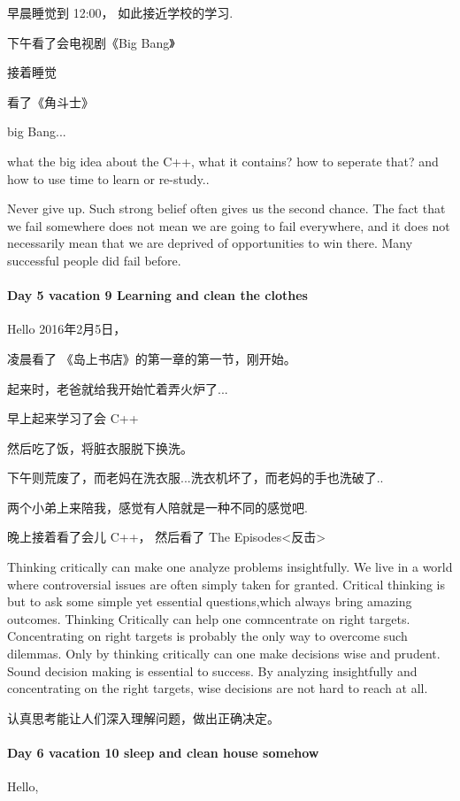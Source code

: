 \documentclass[UTF8,a4paper,8pt]{ctexbook}
\begin{document}
	 	 早晨睡觉到 12:00， 如此接近学校的学习.
	 	 
	 	 下午看了会电视剧《Big Bang》
	 	 
	 	 接着睡觉
	 	 
	 	 看了《角斗士》
	 	 
	 	 big Bang...
	 	 
	 	 what the big idea about the C++, what it contains? how to seperate that? and how to use time to learn or re-study..
	 	 
	 	 Never give up. Such strong belief often gives us the second chance. The fact that we fail somewhere does not mean we are going to fail everywhere, and it does not necessarily mean that we are deprived of opportunities to win there. Many successful people did fail before.
	 	 
 	 \paragraph{Day 5   vacation 9    \quad  Learning and clean the clothes}
	 	 Hello 2016年2月5日，
	 	 
	 	 凌晨看了 《岛上书店》的第一章的第一节，刚开始。
	 	 
	 	 起来时，老爸就给我开始忙着弄火炉了...
	 	 
	 	 早上起来学习了会 C++
	 	 
	 	 然后吃了饭，将脏衣服脱下换洗。
	 	 
	 	 下午则荒废了，而老妈在洗衣服...洗衣机坏了，而老妈的手也洗破了..
	 	 
	 	 两个小弟上来陪我，感觉有人陪就是一种不同的感觉吧.
	 	 
	 	 晚上接着看了会儿 C++， 然后看了 The Episodes<反击>
	 	 
	 	 Thinking critically can make one analyze problems insightfully. We live in a world where controversial issues are often simply taken for granted. Critical thinking is but to ask some simple yet essential questions,which always bring amazing outcomes. Thinking Critically can help one comncentrate on right targets. Concentrating on right targets is probably the only way to overcome such dilemmas. Only by thinking critically can one make decisions wise and prudent. Sound decision making is essential to success. By analyzing insightfully and concentrating on the right targets, wise decisions are not hard to reach at all.
	 	 
	 	 认真思考能让人们深入理解问题，做出正确决定。
 	 \paragraph{Day 6   vacation 10   \quad  sleep and clean house somehow}
	 	 Hello,
	 	 
\end{document}
